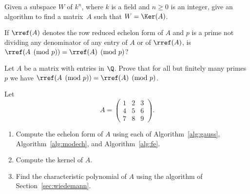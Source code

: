 \begin{exercises}
\item \label{ex:matrixwithkernel}  %
Given a subspace $W$ of $k^n$, where $k$ is a field and
$n\geq 0$ is an integer, give an algorithm to find
a matrix~$A$ such that $W = \Ker(A)$.

\item \label{ex:rrefmod} 
If $\rref(A)$ denotes the row reduced echelon form of $A$
and $p$ is a prime not dividing any denominator
of any entry of $A$ or of $\rref(A)$, is 
$\rref(A \pmod{p}) = \rref(A) \pmod{p}$?

\item \label{ex:rrefsmodp}
Let $A$ be a matrix with entries in $\Q$.  Prove that
for all but finitely many primes~$p$ we have
$\rref(A \pmod{p}) = \rref(A) \pmod{p}$.

\item \label{ex:linalg1to9} Let 
$$A = \left(\begin{array}{rrr}
1&2&3\\
4&5&6\\
7&8&9
\end{array}\right).$$
\begin{enumerate}
\item Compute the echelon form of $A$
using each of Algorithm~\ref{alg:gauss}, Algorithm~\ref{alg:modech},
and Algorithm~\ref{alg:fe}. 
\item Compute the kernel of $A$.
\item Find the characteristic polynomial of $A$
using the algorithm of Section~\ref{sec:wiedemann}.
\end{enumerate}



\end{exercises}
